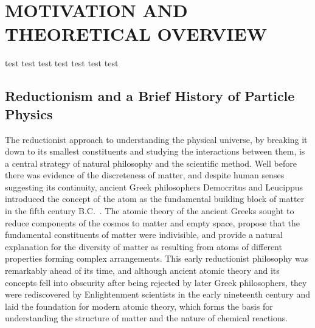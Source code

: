 
\chapter{MOTIVATION AND THEORETICAL OVERVIEW}
\label{Motivation_and_Theoretical_Overview}

\begin{cabstract}
test test test test test test test
\end{cabstract}

\section{Reductionism and a Brief History of Particle Physics}
The reductionist approach to understanding the physical universe, by breaking it down to its smallest constituents and studying the interactions between them, is a central strategy of natural philosophy and the scientific method.
Well before there was evidence of the discreteness of matter, and despite human senses suggesting its continuity, ancient Greek philosophers Democritus and Leucippus introduced the concept of the atom as the fundamental building block of matter in the fifth century B.C.~\cite{sep-atomism-ancient}.
The atomic theory of the ancient Greeks sought to reduce components of the cosmos to matter and empty space, propose that the fundamental constituents of matter were indivisible, and provide a natural explanation for the diversity of matter as resulting from atoms of different properties forming complex arrangements.
This early reductionist philosophy was remarkably ahead of its time, and although ancient atomic theory and its concepts fell into obscurity after being rejected by later Greek philosophers, they were rediscovered by Enlightenment scientists in the early nineteenth century and laid the foundation for modern atomic theory, which forms the basis for understanding the structure of matter and the nature of chemical reactions.

